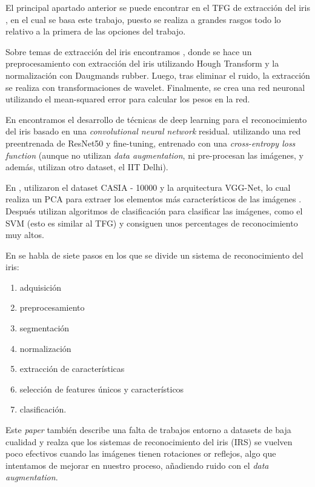  \label{capitulo6}

El principal apartado anterior se puede  encontrar en el TFG de extracción del iris \cite{tfg_iris_2020}, en el cual se basa este trabajo, puesto se realiza a grandes rasgos
todo lo relativo a la primera de las opciones del trabajo.

Sobre temas de extracción del iris encontramos \cite{abdullah_iris_2015}, donde se hace un preprocesamiento con extracción del iris utilizando Hough Transform y la 
normalización con Daugmands rubber. Luego, tras eliminar el ruido, la extracción se realiza con transformaciones de wavelet. Finalmente, se crea una red neuronal
utilizando el mean-squared error para calcular los pesos en la red.

En \cite{minaee_deepiris_2019} encontramos el desarrollo de técnicas de deep learning para el reconocimiento del iris basado en una \textit{convolutional neural network} residual. utilizando una red preentrenada 
de ResNet50 y fine-tuning, entrenado con una \textit{cross-entropy loss function} (aunque no utilizan \textit{data augmentation}, ni pre-procesan las imágenes, y además, utilizan otro dataset, el IIT Delhi). 

En \cite{minaee_experimental_2017}, utilizaron el dataset CASIA - 10000 y la arquitectura VGG-Net, lo cual realiza un PCA para extraer los elementos
más característicos de las imágenes . Después utilizan algoritmos de clasificación para clasificar las imágenes, como el SVM (esto es similar al TFG) y consiguen unos percentages
de reconocimiento muy altos.

En \cite{malgheet_iris_2021} se habla de siete pasos en los que se divide un sistema de reconocimiento del iris:
\begin{enumerate}
\item adquisición
\item preprocesamiento
\item segmentación
\item normalización
\item extracción de características
\item selección de features únicos y característicos
\item clasificación. 
\end{enumerate}
 
 Este \textit{paper} también describe una falta de
 trabajos entorno a datasets de baja cualidad y realza que los sistemas de reconocimiento del iris (IRS) se vuelven 
 poco efectivos cuando las imágenes tienen rotaciones or reflejos, algo que intentamos de mejorar en nuestro proceso, añadiendo ruido con el \textit{data augmentation}.


